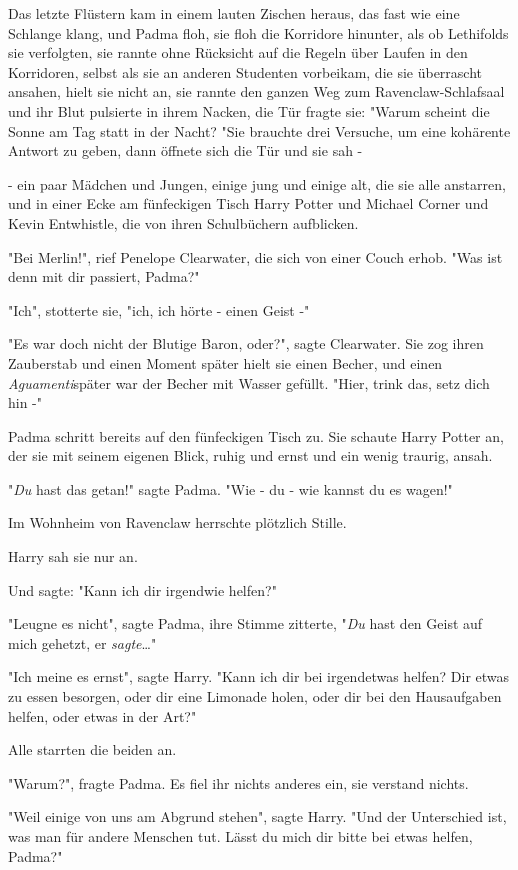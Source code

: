 {Das letzte Flüstern kam in einem lauten Zischen heraus, das fast wie eine Schlange klang, und Padma floh, sie floh die Korridore hinunter, als ob Lethifolds sie verfolgten, sie rannte ohne Rücksicht auf die Regeln über Laufen in den Korridoren, selbst als sie an anderen Studenten vorbeikam, die sie überrascht ansahen, hielt sie nicht an, sie rannte den ganzen Weg zum Ravenclaw-Schlafsaal und ihr Blut pulsierte in ihrem Nacken, die Tür fragte sie: "Warum scheint die Sonne am Tag statt in der Nacht? "Sie brauchte drei Versuche, um eine kohärente Antwort zu geben, dann öffnete sich die Tür und sie sah -

- ein paar Mädchen und Jungen, einige jung und einige alt, die sie alle anstarren, und in einer Ecke am fünfeckigen Tisch Harry Potter und Michael Corner und Kevin Entwhistle, die von ihren Schulbüchern aufblicken.

"Bei Merlin!", rief Penelope Clearwater, die sich von einer Couch erhob. "Was ist denn mit dir passiert, Padma?"

"Ich", stotterte sie, "ich, ich hörte - einen Geist -"

"Es war doch nicht der Blutige Baron, oder?", sagte Clearwater. Sie zog ihren Zauberstab und einen Moment später hielt sie einen Becher, und einen \emph{Aguamenti}später war der Becher mit Wasser gefüllt. "Hier, trink das, setz dich hin -"

Padma schritt bereits auf den fünfeckigen Tisch zu. Sie schaute Harry Potter an, der sie mit seinem eigenen Blick, ruhig und ernst und ein wenig traurig, ansah.

"\emph{Du} hast das getan!" sagte Padma. "Wie - du - wie kannst du es wagen!"

Im Wohnheim von Ravenclaw herrschte plötzlich Stille.

Harry sah sie nur an.

Und sagte: "Kann ich dir irgendwie helfen?"

"Leugne es nicht", sagte Padma, ihre Stimme zitterte, "\emph{Du} hast den Geist auf mich gehetzt, er \emph{sagte}…"

"Ich meine es ernst", sagte Harry. "Kann ich dir bei irgendetwas helfen? Dir etwas zu essen besorgen, oder dir eine Limonade holen, oder dir bei den Hausaufgaben helfen, oder etwas in der Art?"

Alle starrten die beiden an.

"Warum?", fragte Padma. Es fiel ihr nichts anderes ein, sie verstand nichts.

"Weil einige von uns am Abgrund stehen", sagte Harry. "Und der Unterschied ist, was man für andere Menschen tut. Lässt du mich dir bitte bei etwas helfen, Padma?"

}
